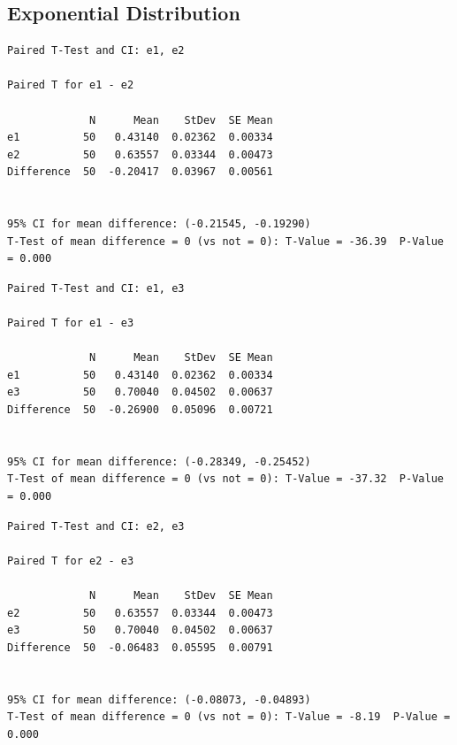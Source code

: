 \documentclass[letterpaper,10pt]{article}
\begin{document}
\subsection{Exponential Distribution}
\begin{samepage}
\begin{verbatim}
Paired T-Test and CI: e1, e2 

Paired T for e1 - e2

             N      Mean    StDev  SE Mean
e1          50   0.43140  0.02362  0.00334
e2          50   0.63557  0.03344  0.00473
Difference  50  -0.20417  0.03967  0.00561


95% CI for mean difference: (-0.21545, -0.19290)
T-Test of mean difference = 0 (vs not = 0): T-Value = -36.39  P-Value = 0.000
\end{verbatim}
\end{samepage}
\begin{samepage}
\begin{verbatim}
Paired T-Test and CI: e1, e3 

Paired T for e1 - e3

             N      Mean    StDev  SE Mean
e1          50   0.43140  0.02362  0.00334
e3          50   0.70040  0.04502  0.00637
Difference  50  -0.26900  0.05096  0.00721


95% CI for mean difference: (-0.28349, -0.25452)
T-Test of mean difference = 0 (vs not = 0): T-Value = -37.32  P-Value = 0.000
\end{verbatim}
\end{samepage}
\begin{samepage}
\begin{verbatim}
Paired T-Test and CI: e2, e3 

Paired T for e2 - e3

             N      Mean    StDev  SE Mean
e2          50   0.63557  0.03344  0.00473
e3          50   0.70040  0.04502  0.00637
Difference  50  -0.06483  0.05595  0.00791


95% CI for mean difference: (-0.08073, -0.04893)
T-Test of mean difference = 0 (vs not = 0): T-Value = -8.19  P-Value = 0.000
\end{verbatim}
\end{samepage}
\end{document}

